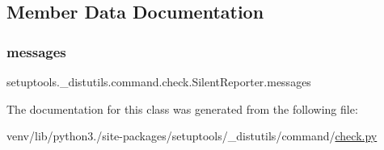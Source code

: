 \subsection{Member Data Documentation}
\mbox{\label{classsetuptools_1_1__distutils_1_1command_1_1check_1_1SilentReporter_a50bccc97ad2b70408127701a7269ada1}} 
\subsubsection{\texorpdfstring{messages}{messages}}
{\footnotesize\ttfamily setuptools.\+\_\+distutils.\+command.\+check.\+Silent\+Reporter.\+messages}



The documentation for this class was generated from the following file\+:\begin{DoxyCompactItemize}
\item 
venv/lib/python3./site-\/packages/setuptools/\+\_\+distutils/command/\hyperlink{setuptools_2__distutils_2command_2check_8py}{check.\+py}\end{DoxyCompactItemize}

